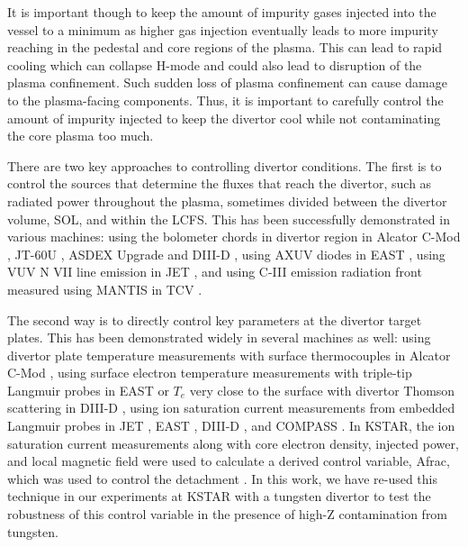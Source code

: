\documentclass[10pt]{iopart}
\begin{document}
It is important though to keep the amount of impurity gases injected into the vessel to a minimum as higher gas injection eventually leads to more impurity reaching in the pedestal and core regions of the plasma.
This can lead to rapid cooling which can collapse H-mode and could also lead to disruption of the plasma confinement.
Such sudden loss of plasma confinement can cause damage to the plasma-facing components.
Thus, it is important to carefully control the amount of impurity injected to keep the divertor cool while not contaminating the core plasma too much.

There are two key approaches to controlling divertor conditions.
The first is to control the sources that determine the fluxes that reach the divertor, such as radiated power throughout the plasma, sometimes divided between the divertor volume, \ac{SOL}, and within the \ac{LCFS}.
This has been successfully demonstrated in various machines:
using the bolometer chords in divertor region in Alcator \mbox{C-Mod} \cite{Goetz_1999_POP}, \mbox{JT-60U} \cite{Asakura_2009_NF}, ASDEX Upgrade \cite{Kallenbach_2012_NF} and \mbox{DIII-D} \cite{Eldon_2019_NME},
using AXUV diodes in EAST \cite{Wu_2018_NF},
using VUV N VII line emission in JET \cite{Maddison_2011_NF}, and
using C-III emission radiation front measured using MANTIS in TCV \cite{Ravensbergen_2021_NC}.

The second way is to directly control key parameters at the divertor target plates.
This has been demonstrated widely in several machines as well:
using divertor plate temperature measurements with surface thermocouples in Alcator C-Mod \cite{Brunner_2017_NF},
using surface electron temperature measurements with triple-tip Langmuir probes in EAST \cite{Eldon_2021_NME} or $T_e$ very close to the surface with divertor Thomson scattering in DIII-D \cite{Eldon_2017_NF},
using ion saturation current measurements from embedded Langmuir probes in JET \cite{Guillemaut_2017_PPCF}, EAST \cite{Yuan_2020_FED}, \mbox{DIII-D} \cite{Eldon_2021_NME}, and COMPASS \cite{Khodunov_2021_PPCF}.
In KSTAR, the ion saturation current measurements along with core electron density, injected power, and local magnetic field were used to calculate a derived control variable, \ac{Afrac}, which was used to control the detachment \cite{Eldon_2022_PPCF}.
In this work, we have re-used this technique in our experiments at KSTAR with a tungsten divertor to test the robustness of this control variable in the presence of high-Z contamination from tungsten.
\end{document}
